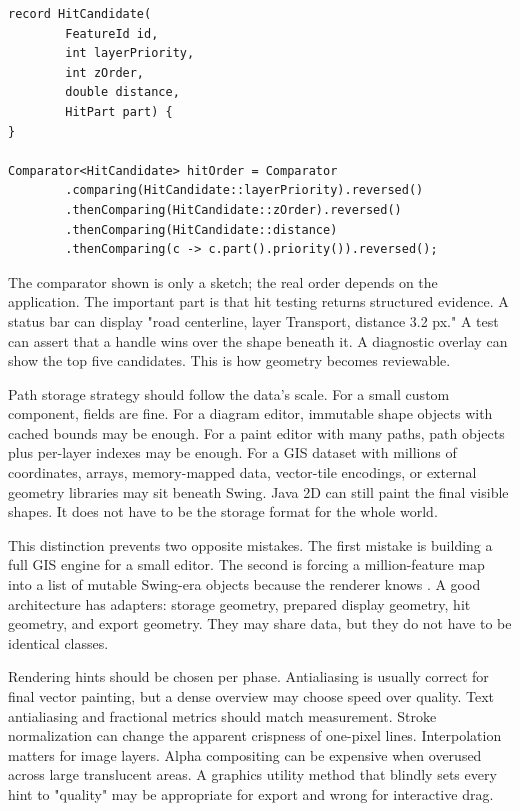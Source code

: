 \begin{lstlisting}[caption={A hit result carries ranking facts, not only an object reference.}]
record HitCandidate(
        FeatureId id,
        int layerPriority,
        int zOrder,
        double distance,
        HitPart part) {
}

Comparator<HitCandidate> hitOrder = Comparator
        .comparing(HitCandidate::layerPriority).reversed()
        .thenComparing(HitCandidate::zOrder).reversed()
        .thenComparing(HitCandidate::distance)
        .thenComparing(c -> c.part().priority()).reversed();
\end{lstlisting}

The comparator shown is only a sketch; the real order depends on the application. The important part is that hit testing returns structured evidence. A status bar can display "road centerline, layer Transport, distance 3.2 px." A test can assert that a handle wins over the shape beneath it. A diagnostic overlay can show the top five candidates. This is how geometry becomes reviewable.

Path storage strategy should follow the data's scale. For a small custom component,  fields are fine. For a diagram editor, immutable shape objects with cached bounds may be enough. For a paint editor with many paths, path objects plus per-layer indexes may be enough. For a GIS dataset with millions of coordinates, arrays, memory-mapped data, vector-tile encodings, or external geometry libraries may sit beneath Swing. Java 2D can still paint the final visible shapes. It does not have to be the storage format for the whole world.

This distinction prevents two opposite mistakes. The first mistake is building a full GIS engine for a small editor. The second is forcing a million-feature map into a list of mutable Swing-era objects because the renderer knows . A good architecture has adapters: storage geometry, prepared display geometry, hit geometry, and export geometry. They may share data, but they do not have to be identical classes.

Rendering hints should be chosen per phase. Antialiasing is usually correct for final vector painting, but a dense overview may choose speed over quality. Text antialiasing and fractional metrics should match measurement. Stroke normalization can change the apparent crispness of one-pixel lines. Interpolation matters for image layers. Alpha compositing can be expensive when overused across large translucent areas. A graphics utility method that blindly sets every hint to "quality" may be appropriate for export and wrong for interactive drag.

